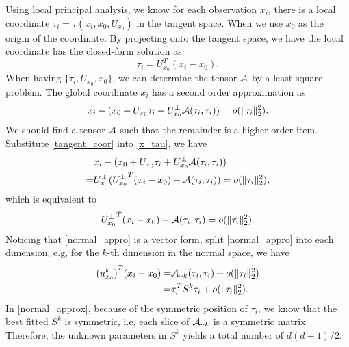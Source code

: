 \documentclass{article}
\theoremstyle{remark}
\begin{document}
Using local principal analysis, we know for each observation $x_i$, there is a local coordinate $\tau_i = \tau(x_i,x_0, U_{x_0})$ in the tangent space. When we use $x_0$ as the origin of the coordinate. By projecting onto the tangent space, we have the local coordinate has the closed-form solution as
\begin{equation}\label{tangent_coor}
\tau_i = U_{x_0}^T (x_i -x_0).
\end{equation}
When having $\{\tau_i, U_{x_0}, x_0\}$, we can determine the tensor $\cal A$ by a least square problem. The global coordinate $x_i$ has a second order approximation as
\begin{equation}\label{x_tau}
 x_i  -  (x_0+ U_{x_0} \tau_i + U_{x_0}^{\perp} {\cal A}(\tau_i,\tau_i)) = o(\|\tau_i\|_2^2).
\end{equation}
We should find a tensor $\cal A$ such that the remainder is a higher-order item.
Substitute \eqref{tangent_coor} into \eqref{x_tau}, we have
\[
\begin{aligned}
 &x_i  -  (x_0+ U_{x_0} \tau_i + U_{x_0}^{\perp} {\cal A}(\tau_i,\tau_i))\\
 =&U_{x_0}^\perp( {U_{x_0}^\perp}^T (x_i -x_0) -{\cal A}(\tau_i,\tau_i) )= o(\|\tau_i\|_2^2),
 \end{aligned}
\]
which is equivalent to 
\begin{equation}\label{normal_appro}
 {U_{x_0}^\perp}^T (x_i -x_0) -{\cal A}(\tau_i,\tau_i) = o(\|\tau_i\|_2^2).
\end{equation}
Noticing that \eqref{normal_appro} is a vector form, split \eqref{normal_appro} into each dimension, e.g, for the $k$-th dimension in the normal space, we have
\begin{equation}\label{normal_approx}
\begin{aligned}
 {(u^k_{x_0})}^T (x_i -x_0) 
=&{\cal A}_{\cdot\cdot k}(\tau_i,\tau_i) +  o(\|\tau_i\|_2^2)\\
=&\tau_i^T S^{k}\tau_i + o(\|\tau_i\|_2^2).
\end{aligned}
\end{equation}
In \eqref{normal_approx}, because of the symmetric position of $\tau_i$, we know that the best fitted $S^k$ is symmetric, i.e, each slice of ${\cal A}_{\cdot\cdot k}$ is a symmetric matrix. Therefore, the unknown parameters in $S^k$ yields a total number of ${d(d+1)}/{2}$. 
\end{document}
